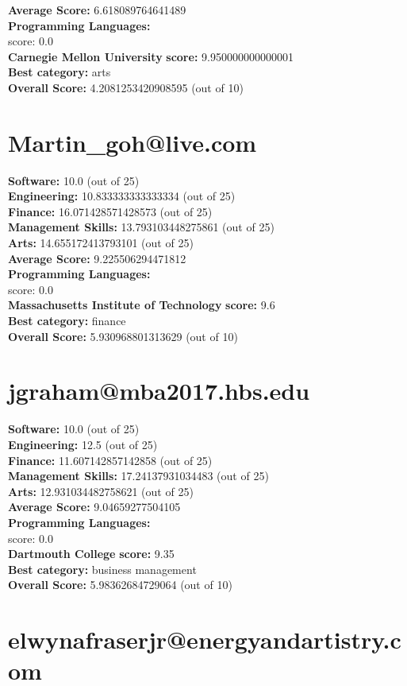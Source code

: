 \documentclass{article}
\begin{document}
\textbf{Average Score: } 6.618089764641489\\
\textbf{Programming Languages:} \\
score: 0.0\\
\textbf{Carnegie Mellon University} \textbf{score:} 9.950000000000001\\
\textbf{Best category: } arts\\
\textbf{Overall Score: }4.2081253420908595 (out of 10)\section{Martin_goh@live.com}
\textbf{Software:} 10.0 (out of 25)\\
\textbf{Engineering: } 10.833333333333334 (out of 25)\\
\textbf{Finance:} 16.071428571428573 (out of 25)\\
\textbf{Management Skills:} 13.793103448275861 (out of 25)\\
\textbf{Arts:} 14.655172413793101 (out of 25)\\
\textbf{Average Score: } 9.225506294471812\\
\textbf{Programming Languages:} \\
score: 0.0\\
\textbf{Massachusetts Institute of Technology} \textbf{score:} 9.6\\
\textbf{Best category: } finance\\
\textbf{Overall Score: }5.930968801313629 (out of 10)\section{jgraham@mba2017.hbs.edu}
\textbf{Software:} 10.0 (out of 25)\\
\textbf{Engineering: } 12.5 (out of 25)\\
\textbf{Finance:} 11.607142857142858 (out of 25)\\
\textbf{Management Skills:} 17.24137931034483 (out of 25)\\
\textbf{Arts:} 12.931034482758621 (out of 25)\\
\textbf{Average Score: } 9.04659277504105\\
\textbf{Programming Languages:} \\
score: 0.0\\
\textbf{Dartmouth College} \textbf{score:} 9.35\\
\textbf{Best category: } business management\\
\textbf{Overall Score: }5.98362684729064 (out of 10)\section{elwynafraserjr@energyandartistry.com}
\end{document}
